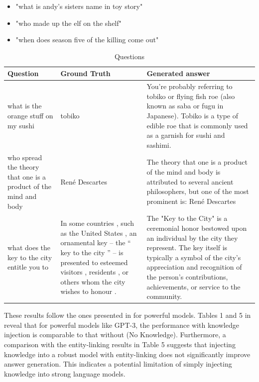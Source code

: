 \documentclass{article}
\begin{document}
\begin{itemize}
    \item "what is andy's sisters name in toy story"
    \item "who made up the elf on the shelf"
    \item "when does season five of the killing come out"
\end{itemize}


\begin{table}[h]
    \begin{tabular}{p{1.5cm} p{3cm} p{3.4cm}}
        \toprule
         \textbf{Question}
         &\textbf{Ground Truth}
         &\textbf{Generated answer}\\
         \midrule
         what is the orange stuff on my sushi
         &tobiko
         &You're probably referring to tobiko or flying fish roe (also known as saba or fugu in Japanese). Tobiko is a type of edible roe that is commonly used as a garnish for sushi and sashimi.\\
         \hline
         who spread the theory that one is a product of the mind and body
         &René Descartes
         &The theory that one is a product of the mind and body is attributed to several ancient philosophers, but one of the most prominent is: René Descartes\\
         \hline
         what does the key to the city entitle you to
         &In some countries , such as the United States , an ornamental key -- the `` key to the city '' -- is presented to esteemed visitors , residents , or others whom the city wishes to honour . 
         &The "Key to the City" is a ceremonial honor bestowed upon an individual by the city they represent. The key itself is typically a symbol of the city's appreciation and recognition of the person's contributions, achievements, or service to the community.\\ 
    \end{tabular}
    \caption{Questions}
    \label{tab:question}
\end{table}

These results follow the ones presented in \cite{baek2023knowledgeaugmentedlanguagemodelprompting} for powerful models. Tables 1 and 5 in \cite{baek2023knowledgeaugmentedlanguagemodelprompting} reveal that for powerful models like GPT-3, the performance with knowledge injection is comparable to that without (No Knowledge). Furthermore, a comparison with the entity-linking results in Table 5 suggests that injecting knowledge into a robust model with entity-linking does not significantly improve answer generation. This indicates a potential limitation of simply injecting knowledge into strong language models.
\end{document}
